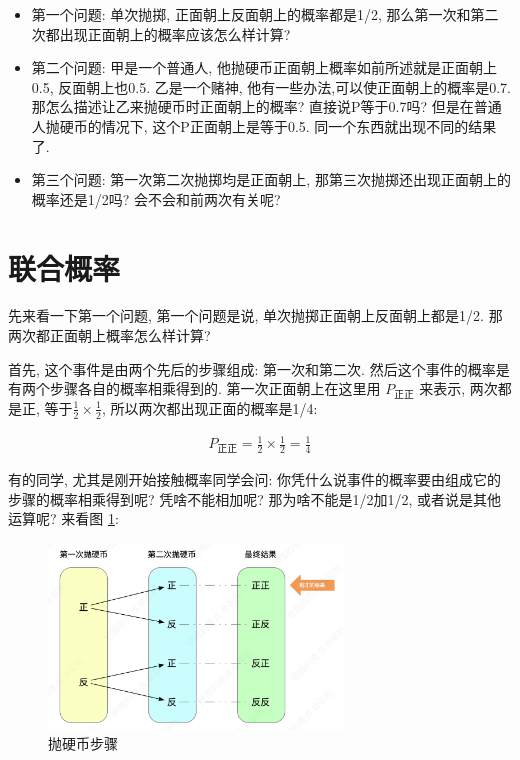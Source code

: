 \begin{itemize}
  \item 第一个问题: 单次抛掷, 正面朝上反面朝上的概率都是1/2, 那么第一次和第二次都出现正面朝上的概率应该怎么样计算? 
  \item 第二个问题: 甲是一个普通人, 他抛硬币正面朝上概率如前所述就是正面朝上0.5, 反面朝上也0.5. 乙是一个赌神, 他有一些办法,可以使正面朝上的概率是0.7. 那怎么描述让乙来抛硬币时正面朝上的概率? 直接说P等于0.7吗? 但是在普通人抛硬币的情况下, 这个P正面朝上是等于0.5. 同一个东西就出现不同的结果了. 
  \item 第三个问题: 第一次第二次抛掷均是正面朝上, 那第三次抛掷还出现正面朝上的概率还是1/2吗? 会不会和前两次有关呢? 
\end{itemize}

\section{联合概率}

先来看一下第一个问题, 第一个问题是说, 单次抛掷正面朝上反面朝上都是1/2. 那两次都正面朝上概率怎么样计算? 

首先, 这个事件是由两个先后的步骤组成: 第一次和第二次. 然后这个事件的概率是有两个步骤各自的概率相乘得到的. 第一次正面朝上在这里用 $P_{\mbox{正正}}$ 来表示, 两次都是正, 等于$\frac{1}{2} \times \frac{1}{2}$, 所以两次都出现正面的概率是1/4: 

\begin{align*}
  P_{\mbox{正正}} = \frac{1}{2} \times \frac{1}{2} = \frac{1}{4}
\end{align*}

有的同学, 尤其是刚开始接触概率同学会问: 你凭什么说事件的概率要由组成它的步骤的概率相乘得到呢? 凭啥不能相加呢? 那为啥不能是1/2加1/2, 或者说是其他运算呢? 来看图 \ref{fig:img5_2}:

\begin{figure}[ht]
  \centering
  \includegraphics[width=0.7\textwidth]{asset/bd947955-687e-49b7-a430-c6921cd49504.png}
  \caption{抛硬币步骤}
  \label{fig:img5_2}
\end{figure}

